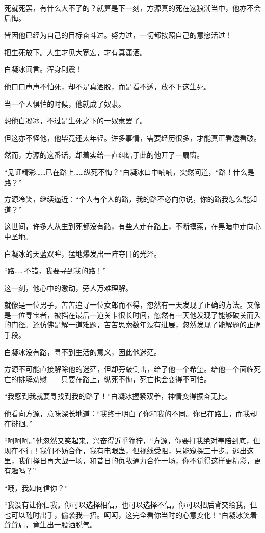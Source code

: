 \begin{this_body}
死就死罢，有什么大不了的？就算是下一刻，方源真的死在这狼潮当中，他亦不会后悔。

皆因他已经为自己的目标奋斗过。努力过，一切都按照自己的意愿活过！

把生死放下。人生才见大宽宏，才有真潇洒。

白凝冰闻言。浑身剧震！

他口口声声不怕死，却不是真洒脱，而是看不透，放不下这生死。

当一个人惧怕的时候，他就成了奴隶。

想他白凝冰，不过是生死之下的一奴隶罢了。

但这亦不怪他，他毕竟还太年轻。许多事情，需要经历很多，才能真正看透看破。

然而，方源的这番话，却着实给一直纠结于此的他开了一扇窗。

“见证精彩……已在路上……纵死不悔？”白凝冰口中喃喃，突然问道，“路！什么是路？”

方源冷笑，继续逼近：“个人有个人的路，我的路不必向你说，你的路我怎么能知道？”

这世间，许多人从生到死都没有路，有些人走在路上，不断摸索，在黑暗中走向心中圣地。

白凝冰的天蓝双眸，猛地爆发出一阵夺目的光泽。

“路……不错，我要寻到我的路！”

这一刻，他心中的激动，旁人万难理解。

就像是一位男子，苦苦追寻一位女郎而不得，忽然有一天发现了正确的方法。又像是一位寻宝者，被挡在最后一道关卡很长时间，忽然有一天他发现了能够破关而入的门径。还仿佛是解一道难题，苦苦思索数年没有进展，忽然发现了能解题的正确手段。

白凝冰没有路，寻不到生活的意义，因此他迷茫。

方源不可能直接解除他的迷茫，但却旁敲侧击，给了他一个希望。给他一个面临死亡的排解劝慰――只要在路上，纵死不悔，死亡也会变得不可怕。

“我感到我就要寻找到我的路了！”白凝冰握紧双拳，神情变得振奋无比。

他看向方源，意味深长地道：“我终于明白了你和我的不同。你已在路上，而我却在徘徊。”

“呵呵呵。”他忽然又笑起来，兴奋得近乎狰狞，“方源，你要打我绝对奉陪到底，但现在不行！我们不妨合作，我有电眼蛊，但视线受阻，只能窥探三十步。逃出这里，我们择日再大战一场，和昔日的仇敌通力合作一场，你不觉得这样更精彩，更有趣吗？”

“哦，我如何信你？”

“我没有让你信我。你可以选择相信，也可以选择不信。你可以把后背交给我，但也可以随时出手，偷袭我一招。呵呵，这完全看你当时的心意变化！”白凝冰笑着耸耸肩，竟生出一股洒脱气。


\end{this_body}

